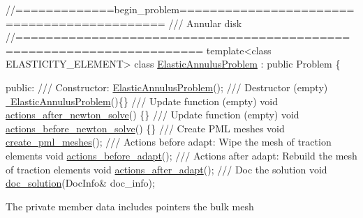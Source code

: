  
\begin{DoxyCodeInclude}
\textcolor{comment}{//=============begin\_problem============================================ }
\textcolor{comment}{/// Annular disk}
\textcolor{comment}{}\textcolor{comment}{//====================================================================== }
\textcolor{keyword}{template}<\textcolor{keyword}{class} ELASTICITY\_ELEMENT>
\textcolor{keyword}{class }\hyperlink{classElasticAnnulusProblem}{ElasticAnnulusProblem} : \textcolor{keyword}{public} Problem
\{

\textcolor{keyword}{public}:
\textcolor{comment}{}
\textcolor{comment}{ /// Constructor:}
\textcolor{comment}{} \hyperlink{classElasticAnnulusProblem_aedf3d30576ccc20e2d8aa809cf075228}{ElasticAnnulusProblem}();
\textcolor{comment}{}
\textcolor{comment}{ /// Destructor (empty)}
\textcolor{comment}{} \hyperlink{classElasticAnnulusProblem_a7e791acd99dc0ae25ab9f2e2fd07c587}{~ElasticAnnulusProblem}()\{\}
 \textcolor{comment}{}
\textcolor{comment}{ /// Update function (empty)}
\textcolor{comment}{} \textcolor{keywordtype}{void} \hyperlink{classElasticAnnulusProblem_adfb87876ac9981899c6c0b4caf0786f9}{actions\_after\_newton\_solve}() \{\}
\textcolor{comment}{}
\textcolor{comment}{ /// Update function (empty)}
\textcolor{comment}{} \textcolor{keywordtype}{void} \hyperlink{classElasticAnnulusProblem_af50a0dc2601e1a5e884166941d2cb9ce}{actions\_before\_newton\_solve}() \{\}
\textcolor{comment}{}
\textcolor{comment}{ /// Create PML meshes}
\textcolor{comment}{} \textcolor{keywordtype}{void} \hyperlink{classElasticAnnulusProblem_a0d2b0cc613caaca7c8f1a78c80b40bc7}{create\_pml\_meshes}();
\textcolor{comment}{}
\textcolor{comment}{ /// Actions before adapt: Wipe the mesh of traction elements}
\textcolor{comment}{} \textcolor{keywordtype}{void} \hyperlink{classElasticAnnulusProblem_abc8f38dd49a37b06212c168588301900}{actions\_before\_adapt}();
\textcolor{comment}{}
\textcolor{comment}{ /// Actions after adapt: Rebuild the mesh of traction elements}
\textcolor{comment}{} \textcolor{keywordtype}{void} \hyperlink{classElasticAnnulusProblem_aa47beeedeac662b19c0f992daf77ef25}{actions\_after\_adapt}();
\textcolor{comment}{}
\textcolor{comment}{ /// Doc the solution}
\textcolor{comment}{} \textcolor{keywordtype}{void} \hyperlink{classElasticAnnulusProblem_ab2952a8591047f62f9f66cfe29a533de}{doc\_solution}(DocInfo& doc\_info);

\end{DoxyCodeInclude}


The private member data includes pointers the bulk mesh


